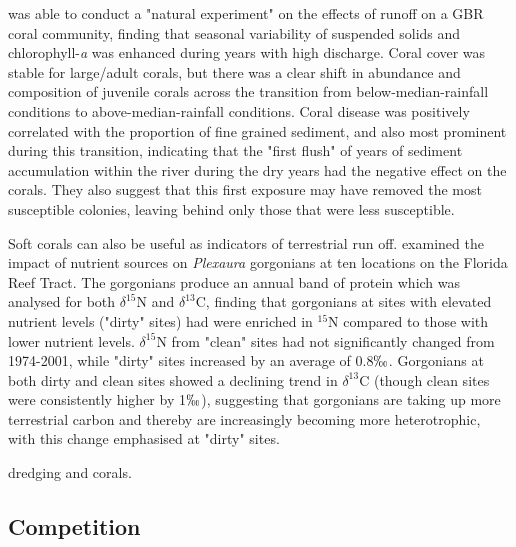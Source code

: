 \documentclass[11pt,a4paper]{article}
\begin{document}
\cite{Thompson2014} was able to conduct a "natural experiment" on the effects of runoff on a GBR coral community, finding that seasonal variability of suspended solids and chlorophyll-\textit{a} was enhanced during years with high discharge.
 Coral cover was stable for large/adult corals, but there was a clear shift in abundance and composition of juvenile corals across the transition from below-median-rainfall conditions to above-median-rainfall conditions.
  Coral disease was positively correlated with the proportion of fine grained sediment, and also most prominent during this transition, indicating that the "first flush" of years of sediment accumulation within the river during the dry years had the negative effect on the corals.
 They also suggest that this first exposure may have removed the most susceptible colonies, leaving behind only those that were less susceptible.

Soft corals can also be useful as indicators of terrestrial run off.
 \cite{WardPaige2005Nitrogen} examined the impact of nutrient sources on \textit{Plexaura} gorgonians at ten locations on the Florida Reef Tract.
  The gorgonians produce an annual band of protein which was analysed for both $\delta ^{15}$N and $\delta ^{13}$C, finding that gorgonians at sites with elevated nutrient levels ("dirty" sites) had were enriched in $^{15}$N compared to those with lower nutrient levels.
   $\delta ^{15}$N from "clean" sites had not significantly changed from 1974-2001, while "dirty" sites increased by an average of 0.8$\permil$.
   Gorgonians at both dirty and clean sites showed a declining trend in $\delta ^{13}$C (though clean sites were consistently higher by 1$\permil$), suggesting that gorgonians are taking up more terrestrial carbon and thereby are increasingly becoming more heterotrophic, with this change emphasised at "dirty" sites.


 \cite{Erftemeijer2012} dredging and corals.


\subsection{Competition}

\end{document}
